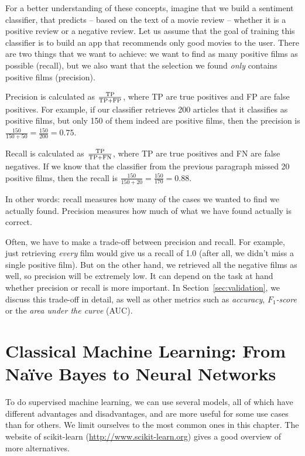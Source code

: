 For a better understanding of these concepts, imagine that we build a sentiment classifier, that predicts -- based on the
text of a movie review -- whether it is a positive review or a
negative review. Let us assume that the goal of training this classifier is to build an app that recommends only good movies to the user. There are two things
that we want to achieve: we want to find as many positive films as possible (recall), but we also want that the selection we found
\emph{only} contains positive films (precision).

Precision is calculated as $\frac{\rm{TP}}{\rm{TP}+\rm{FP}}$, where TP are true
positives and FP are false positives. For example, if our classifier
retrieves 200 articles that it classifies as positive films, but only
150 of them indeed are positive films, then the precision is
$\frac{150}{150+50} = \frac{150}{200} = 0.75$.

Recall is calculated as $\frac{\rm{TP}}{\rm{TP}+\rm{FN}}$, where TP are true
positives and FN are false negatives. If we know that the classifier
from the previous paragraph missed 20 positive films, then the recall
is $\frac{150}{150+20} = \frac{150}{170}= 0.88$.

In other words: recall measures how many of the cases we wanted to
find we actually found. Precision measures how much of what we have
found actually is correct.

Often, we have to make a trade-off between precision and recall. For
example, just retrieving \emph{every} film would give us a recall of
1.0 (after all, we didn't miss a single positive film). But on the
other hand, we retrieved all the negative films as well, so precision
will be extremely low. It can depend on the task at hand whether
precision or recall is more important. In
Section~\ref{sec:validation}, we discuss this trade-off in detail, as well as other metrics such as \emph{accuracy}, \emph{$F_1$-score} or the \emph{area under the curve} (AUC).

%
\section{Classical Machine Learning: From Na\"{i}ve Bayes to Neural Networks}
\label{sec:nb2dnn}
To do supervised machine learning, we can use several models, all of
which have different advantages and disadvantages, and are more useful
for some use cases than for others.
We limit ourselves to the most common ones in this chapter. The
website of scikit-learn (\url{http://www.scikit-learn.org}) gives a
good overview of more alternatives.

